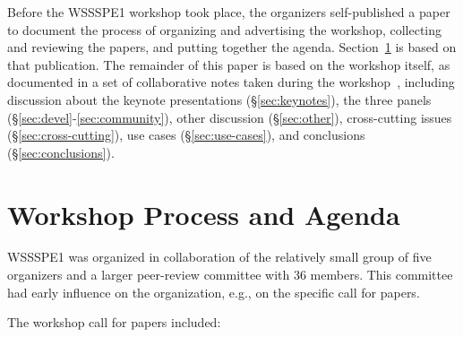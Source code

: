 \documentclass[11pt, oneside]{amsart}
\begin{document}
Before the WSSSPE1 workshop took place, the organizers self-published
a paper~\cite{WSSSPE1-pre-report} to document the process of
organizing and advertising the workshop, collecting and reviewing the
papers, and putting together the agenda. Section~\ref{sec:process} is
based on that publication. The remainder of this paper is based on the
workshop itself, as documented in a set of collaborative notes taken
during the workshop~\cite{WSSSPE1-google-notes}, including discussion
about the keynote presentations (\S\ref{sec:keynotes}), the three
panels (\S\ref{sec:devel}-\ref{sec:community}), other discussion
(\S\ref{sec:other}), cross-cutting issues (\S\ref{sec:cross-cutting}),
use cases (\S\ref{sec:use-cases}), and conclusions
(\S\ref{sec:conclusions}).
 
\section{Workshop Process and Agenda} \label{sec:process}

WSSSPE1 was organized in collaboration of the relatively small group
of five organizers and a larger peer-review committee with 36
members. This committee had early influence on the organization, e.g.,
on the specific call for papers.

The workshop call for papers included:
\end{document}
